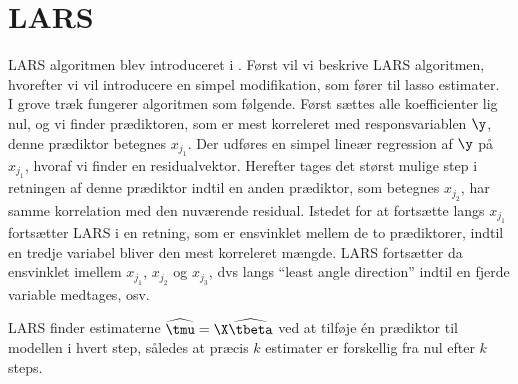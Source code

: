 \section{LARS}
LARS algoritmen blev introduceret i \citep{efron}. 
Først vil vi beskrive LARS algoritmen, hvorefter vi vil introducere en simpel modifikation, som fører til lasso estimater. \\[2mm]
%
I grove træk fungerer algoritmen som følgende. 
Først sættes alle koefficienter lig nul, og vi finder prædiktoren, som er mest korreleret med responsvariablen \(\y\), denne prædiktor betegnes \(x_{j_1}\).
Der udføres en simpel lineær regression af \(\y\) på \(x_{j_1}\), hvoraf vi finder en residualvektor.
Herefter tages det størst mulige step i retningen af denne prædiktor indtil en anden prædiktor, som betegnes \(x_{j_2}\), har samme korrelation med den nuværende residual.
Istedet for at fortsætte langs \(x_{j_1}\) fortsætter LARS i en retning, som er ensvinklet mellem de to prædiktorer, indtil en tredje variabel bliver den mest korreleret mængde.
LARS fortsætter da ensvinklet imellem \(x_{j_1}\), \(x_{j_2}\) og \(x_{j_3}\), dvs langs ``least angle direction'' indtil en fjerde variable medtages, osv.

LARS finder estimaterne \(\widehat{\tmu} = \X \widehat{\tbeta}\) ved at tilføje én prædiktor til modellen i hvert step, således at præcis \(k\) estimater er forskellig fra nul efter \(k\) steps.

